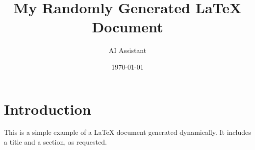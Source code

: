 \documentclass{article}
\title{My Randomly Generated LaTeX Document}
\author{AI Assistant}
\date{\today}
\begin{document}
\maketitle

\section{Introduction}
This is a simple example of a LaTeX document generated dynamically. It includes a title and a section, as requested.
\end{document}
